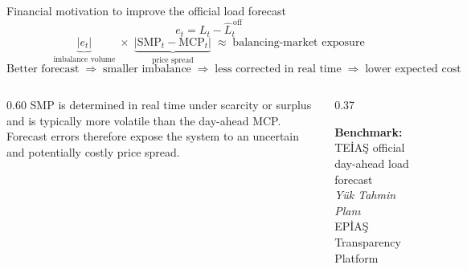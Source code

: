 \documentclass[10pt,aspectratio=169]{beamer}
\begin{document}
\begin{frame}{Financial motivation to improve the official load forecast}
  \small
  \[
    e_t = L_t - \widehat{L}_t^{\,\mathrm{off}}
  \]
  \vspace{-0.5em}
  \[
    \underbrace{|e_t|}_{\text{imbalance volume}}
    \;\times\;
    \underbrace{|\mathrm{SMP}_t - \mathrm{MCP}_t|}_{\text{price spread}}
    \;\approx\;
    \text{balancing-market exposure}
  \]
  \vspace{-0.3em}
  \[
    \text{Better forecast}
    \;\Longrightarrow\;
    \text{smaller imbalance}
    \;\Longrightarrow\;
    \text{less corrected in real time}
    \;\Longrightarrow\;
    \text{lower expected cost}
  \]
  \vspace{0.2em}
  \begin{columns}
    \begin{column}{0.60\textwidth}
      \small
      SMP is determined in real time under scarcity or surplus
      and is typically more volatile than the day-ahead MCP.
      Forecast errors therefore expose the system to an uncertain
      and potentially costly price spread.
    \end{column}
    \begin{column}{0.37\textwidth}
      \begin{block}{}
        \centering\small
        \textbf{Benchmark:} TEİAŞ official
        day-ahead load forecast\\[0.2em]
        \footnotesize\textit{Yük Tahmin Plan\i}\\
        EPİAŞ Transparency Platform
      \end{block}
    \end{column}
  \end{columns}
\end{frame}
\end{document}

